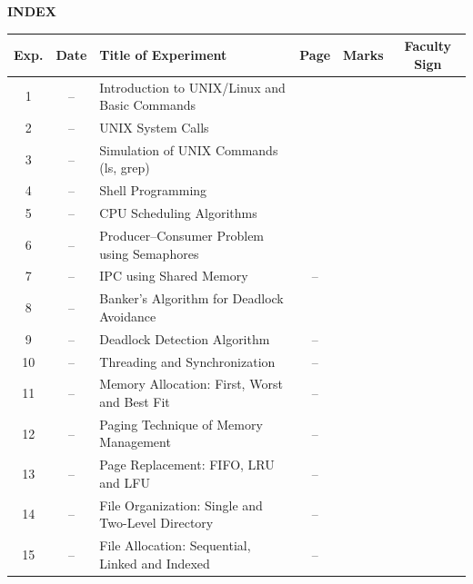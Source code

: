 \thispagestyle{plain}

\begin{center}
    {\LARGE\bfseries INDEX}
\end{center}

\vspace{0.5cm}

\renewcommand{\arraystretch}{1.3}
\noindent\begin{tabularx}{\linewidth}{|c|c|>{\raggedright\arraybackslash}X|c|c|c|}
\hline
\textbf{Exp.} & \textbf{Date} & \textbf{Title of Experiment} & \textbf{Page} & \textbf{Marks} & \textbf{Faculty Sign} \\ \hline
1  & -- & Introduction to UNIX/Linux and Basic Commands & \pageref{exp:unix} & & \\ \hline
2  & -- & UNIX System Calls & \pageref{exp:syscalls} & & \\ \hline
3  & -- & Simulation of UNIX Commands (ls, grep) & \pageref{exp:simulate} & & \\ \hline
4  & -- & Shell Programming & \pageref{exp:shell} & & \\ \hline
5  & -- & CPU Scheduling Algorithms & \pageref{exp:scheduling} & & \\ \hline
6  & -- & Producer--Consumer Problem using Semaphores & \pageref{exp:producerconsumer} & & \\ \hline
7  & -- & IPC using Shared Memory & -- & & \\ \hline
8  & -- & Banker's Algorithm for Deadlock Avoidance & \pageref{exp:bankers} & & \\ \hline
9  & -- & Deadlock Detection Algorithm & -- & & \\ \hline
10 & -- & Threading and Synchronization & -- & & \\ \hline
11 & -- & Memory Allocation: First, Worst and Best Fit & -- & & \\ \hline
12 & -- & Paging Technique of Memory Management & -- & & \\ \hline
13 & -- & Page Replacement: FIFO, LRU and LFU & -- & & \\ \hline
14 & -- & File Organization: Single and Two-Level Directory & -- & & \\ \hline
15 & -- & File Allocation: Sequential, Linked and Indexed & -- & & \\ \hline
\end{tabularx}
